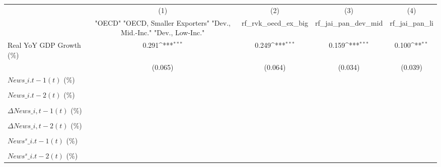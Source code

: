 {
\def\sym#1{\ifmmode^{#1}\else\(^{#1}\)\fi}
\begin{tabular}{l*{4}{c}}
\toprule
                    &\multicolumn{1}{c}{(1)}&\multicolumn{1}{c}{(2)}&\multicolumn{1}{c}{(3)}&\multicolumn{1}{c}{(4)}\\
                    &\multicolumn{1}{c}{ "OECD" "OECD, Smaller Exporters" "Dev., Mid.-Inc." "Dev., Low-Inc."}&\multicolumn{1}{c}{rf\_rvk\_oecd\_ex\_big}&\multicolumn{1}{c}{rf\_jai\_pan\_dev\_mid}&\multicolumn{1}{c}{rf\_jai\_pan\_li}\\
\midrule
Real YoY GDP Growth (\%)&       0.291\sym{***}&       0.249\sym{***}&       0.159\sym{***}&       0.100\sym{**} \\
                    &     (0.065)         &     (0.064)         &     (0.034)         &     (0.039)         \\
\addlinespace
$ News\_{i.t-1}(t)$ (\%)&                     &                     &                     &                     \\
                    &                     &                     &                     &                     \\
\addlinespace
$ News\_{i.t-2}(t)$ (\%)&                     &                     &                     &                     \\
                    &                     &                     &                     &                     \\
\addlinespace
$ \Delta News\_{i,t-1}(t)$ (\%)&                     &                     &                     &                     \\
                    &                     &                     &                     &                     \\
\addlinespace
$ \Delta News\_{i,t-2}(t)$ (\%)&                     &                     &                     &                     \\
                    &                     &                     &                     &                     \\
\addlinespace
$ News^s\_{i.t-1}(t)$ (\%)&                     &                     &                     &                     \\
                    &                     &                     &                     &                     \\
\addlinespace
$ News^s\_{i.t-2}(t)$ (\%)&                     &                     &                     &                     \\

\end{tabular}}
